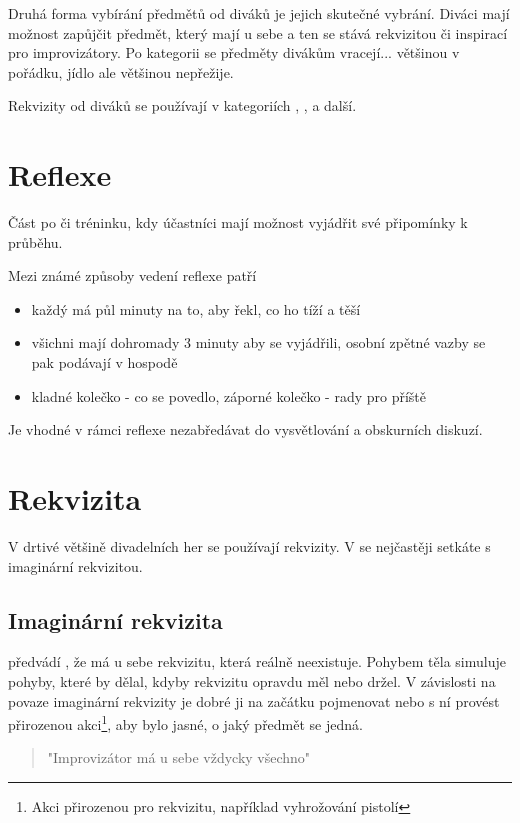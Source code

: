 \documentclass[main.tex]{subfiles}
\begin{document}
Druhá forma vybírání předmětů od diváků je jejich skutečné vybrání. Diváci mají možnost zapůjčit předmět, který mají u sebe a ten se stává rekvizitou či inspirací pro improvizátory. Po kategorii se předměty divákům vracejí... většinou v pořádku, jídlo ale většinou nepřežije. 
 
Rekvizity od diváků se používají v kategoriích , , a další. 
 
 
\needspace{5cm} \section{Reflexe} \label{reflexe} Část po  či tréninku, kdy účastníci mají možnost vyjádřit své připomínky k průběhu. 
 
Mezi známé způsoby vedení reflexe patří 
\begin{itemize}
\item každý má půl minuty na to, aby řekl, co ho tíží a těší
\item všichni mají dohromady 3 minuty aby se vyjádřili, osobní zpětné vazby se pak podávají v hospodě
\item kladné kolečko - co se povedlo, záporné kolečko - rady pro příště
\end{itemize}
 
Je vhodné v rámci reflexe nezabředávat do vysvětlování a obskurních diskuzí.    
    
 
\needspace{5cm} \section{Rekvizita} \label{rekvizita} V drtivé většině divadelních her se používají rekvizity. V  se nejčastěji setkáte s imaginární rekvizitou. 
 
 
\subsection{ Imaginární rekvizita }  předvádí , že má u sebe rekvizitu, která reálně neexistuje. Pohybem těla simuluje pohyby, které by dělal, kdyby rekvizitu opravdu měl nebo držel. V závislosti na povaze imaginární rekvizity je dobré ji na začátku pojmenovat nebo s ní provést přirozenou akci\footnote{Akci přirozenou pro rekvizitu, například vyhrožování pistolí}, aby bylo jasné, o jaký předmět se jedná. 
 
\begin{quote}"Improvizátor má u sebe vždycky všechno"\end{quote} 
 
\end{document}

